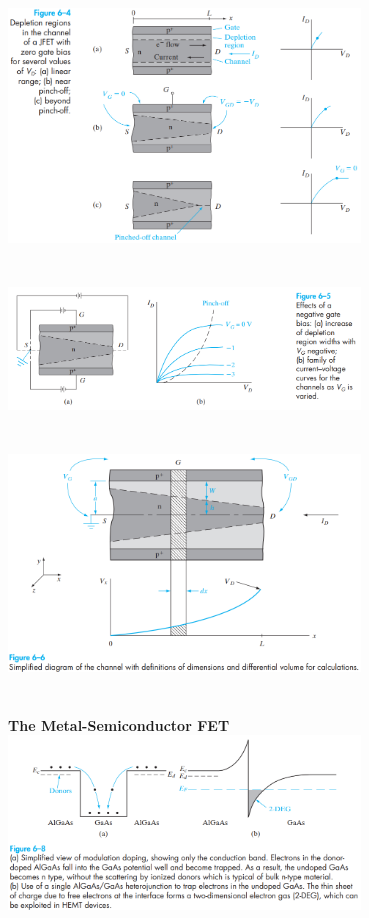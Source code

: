 \documentclass[8pt]{article}
\newcommand{\sect}[1]{\noindent\textbf{#1}\\}
\newcommand{\hl}{\noindent\makebox[\linewidth]{\rule{\textwidth}{0.2pt}}}
\begin{document}
\begin{center}
		\includegraphics[width=0.7\textwidth]{fig6-4} \\ \hl \\~\\
		\includegraphics[width=0.7\textwidth]{fig6-5} \\ \hl \\~\\
		\includegraphics[width=0.7\textwidth]{fig6-6} \\ \hl \\~\\
		\sect{\Large{The Metal-Semiconductor FET}}
		\includegraphics[width=0.7\textwidth]{fig6-8} \\ \hl \\~\\

\end{center}
\end{document}
